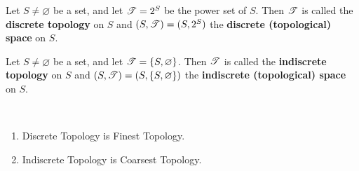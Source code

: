 \documentclass[11pt,openany]{article}
\begin{document}
\vfill
\begin{example}
	Let $S\neq\varnothing$ be a set, and let $\mathscr{T}=2^S$ be the power set of $S$. Then $\mathscr{T}$ is called the \textbf{discrete topology} on $S$ and $(S,\mathscr{T})=(S,2^S)$ the \textbf{discrete (topological) space} on $S$.
\end{example}
\vfill
\begin{example}
	Let $S\neq\varnothing$ be a set, and let $\mathscr{T}=\set{S,\varnothing}$. Then $\mathscr{T}$ is called the \textbf{indiscrete topology} on $S$ and $(S,\mathscr{T})=(S,\set{S,\varnothing})$ the \textbf{indiscrete (topological) space} on $S$.
\end{example}
\vfill
\begin{note}
\ \begin{enumerate}[(1)]
	\item Discrete Topology is Finest Topology.
	\item Indiscrete Topology is Coarsest Topology.
\end{enumerate}
\end{note}
\end{document}
